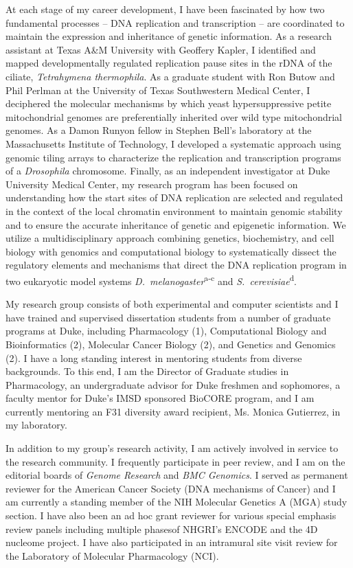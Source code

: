 \documentclass{nihbiosketch}
\newcommand\dros{{\itshape Drosophila}\xspace}
\newcommand\dmel{{\itshape D.~melanogaster}\xspace}
\newcommand\scer{{\itshape S.~cerevisiae}\xspace}
\begin{document}
\begin{statement}
\addtolength{\parskip}{1.5mm}
\noindent At each stage of my career development, I have been fascinated by how two fundamental processes -- DNA replication and transcription -- are coordinated to maintain the expression and inheritance of genetic information.  As a research assistant at Texas A&M University with Geoffery Kapler, I identified and mapped developmentally regulated replication pause sites in the rDNA of the ciliate, \textit{Tetrahymena thermophila}.  As a graduate student with Ron Butow and Phil Perlman at the University of Texas Southwestern Medical Center, I deciphered the molecular mechanisms by which yeast hypersuppressive petite mitochondrial genomes are preferentially inherited over wild type mitochondrial genomes.  As a Damon Runyon fellow in Stephen Bell's laboratory at the Massachusetts Institute of Technology, I developed a systematic approach using genomic tiling arrays to characterize the replication and transcription programs of a \dros chromosome. Finally, as an independent investigator at Duke University Medical Center, my research program has been focused on understanding how the start sites of DNA replication are selected and regulated in the context of the local chromatin environment to maintain genomic stability and to ensure the accurate inheritance of genetic and epigenetic information. We utilize a multidisciplinary approach combining genetics, biochemistry, and cell biology with genomics and computational biology to systematically dissect the regulatory elements and mechanisms that direct the DNA replication program in two eukaryotic model systems \dmel \textsuperscript{a-c} and \scer \textsuperscript{d}.

\noindent My research group consists of both experimental and computer scientists and I have trained and supervised dissertation students from a number of graduate programs at Duke, including Pharmacology (1), Computational Biology and Bioinformatics (2), Molecular Cancer Biology (2), and Genetics and Genomics (2).   I have a long standing interest in mentoring students from diverse backgrounds.  To this end, I am the Director of Graduate studies in Pharmacology, an undergraduate advisor for Duke freshmen and sophomores, a faculty mentor for Duke's IMSD sponsored BioCORE program, and I am currently mentoring an F31 diversity award recipient, Ms. Monica Gutierrez, in my laboratory.

\noindent In addition to my group's research activity, I am actively involved in service to the research community.  I frequently participate in peer review, and I am on the editorial boards of \textit{Genome Research} and \textit{BMC Genomics}.  I served as permanent reviewer for the American Cancer Society (DNA mechanisms of Cancer) and I am currently a standing member of the NIH Molecular Genetics A (MGA) study section.  I have also been an ad hoc grant reviewer for various special emphasis review panels including multiple phasesof NHGRI's ENCODE and the 4D nucleome project. I have also participated in an intramural site visit review for the Laboratory of Molecular Pharmacology (NCI).


\end{statement}
\end{document}
